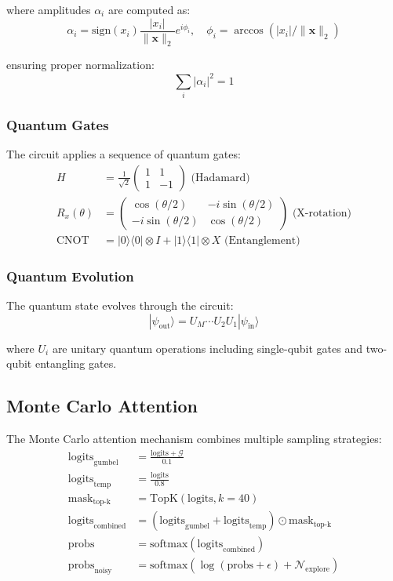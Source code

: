 \documentclass{article}
\begin{document}
where amplitudes $\alpha_i$ are computed as:
\begin{equation}
\alpha_i = \text{sign}(x_i)\frac{|x_i|}{\|\mathbf{x}\|_2}e^{i\phi_i}, \quad \phi_i = \arccos(|x_i|/\|\mathbf{x}\|_2)
\end{equation}

ensuring proper normalization:
\begin{equation}
\sum_i |\alpha_i|^2 = 1
\end{equation}

\subsubsection{Quantum Gates}
The circuit applies a sequence of quantum gates:
\begin{align*}
H &= \frac{1}{\sqrt{2}}\begin{pmatrix} 1 & 1 \\ 1 & -1 \end{pmatrix} \text{ (Hadamard)} \\
R_x(\theta) &= \begin{pmatrix} \cos(\theta/2) & -i\sin(\theta/2) \\ -i\sin(\theta/2) & \cos(\theta/2) \end{pmatrix} \text{ (X-rotation)} \\
\text{CNOT} &= |0\rangle\langle0| \otimes I + |1\rangle\langle1| \otimes X \text{ (Entanglement)}
\end{align*}

\subsubsection{Quantum Evolution}
The quantum state evolves through the circuit:
\begin{equation}
|\psi_{\text{out}}\rangle = U_M\cdots U_2U_1|\psi_{\text{in}}\rangle
\end{equation}

where $U_i$ are unitary quantum operations including single-qubit gates and two-qubit entangling gates.

\subsection{Monte Carlo Attention}
The Monte Carlo attention mechanism combines multiple sampling strategies:
\begin{align*}
\text{logits}_{\text{gumbel}} &= \frac{\text{logits} + \mathcal{G}}{0.1} \\
\text{logits}_{\text{temp}} &= \frac{\text{logits}}{0.8} \\
\text{mask}_{\text{top-k}} &= \text{TopK}(\text{logits}, k=40) \\
\text{logits}_{\text{combined}} &= (\text{logits}_{\text{gumbel}} + \text{logits}_{\text{temp}}) \odot \text{mask}_{\text{top-k}} \\
\text{probs} &= \text{softmax}(\text{logits}_{\text{combined}}) \\
\text{probs}_{\text{noisy}} &= \text{softmax}(\log(\text{probs} + \epsilon) + \mathcal{N}_{\text{explore}})
\end{align*}
\end{document}
